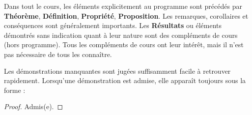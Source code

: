 \documentclass{report}
\begin{document}
\begin{minipage}{\textwidth}
Dans tout le cours, les éléments explicitement au programme sont précédés par \textbf{Théorème}, \textbf{Définition}, \textbf{Propriété}, \textbf{Proposition}. Les remarques, corollaires et conséquences sont généralement importants. Les \textbf{Résultats} ou éléments démontrés sans indication quant à leur nature sont des compléments de cours (hors programme). Tous les compléments de cours ont leur intérêt, mais il n'est pas nécessaire de tous les connaître.

Les démonstrations manquantes sont jugées suffisamment facile à retrouver rapidement. Lorsqu'une démonstration est admise, elle apparaît toujours sous la forme :

\begin{proof}
    Admis(e).
\end{proof}
\end{minipage}

\newpage

\pagestyle{main}



\newpage
\pagestyle{empty}

\printindex
\end{document}
